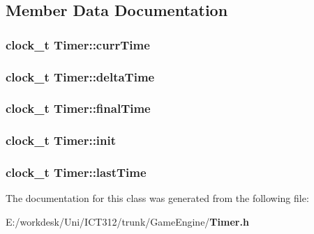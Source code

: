 \subsection{Member Data Documentation}
\subsubsection[{curr\+Time}]{\setlength{\rightskip}{0pt plus 5cm}clock\+\_\+t Timer\+::curr\+Time\hspace{0.3cm}{\ttfamily [private]}}\label{class_timer_af49068258630469cc88806ee557b626e}
\subsubsection[{delta\+Time}]{\setlength{\rightskip}{0pt plus 5cm}clock\+\_\+t Timer\+::delta\+Time\hspace{0.3cm}{\ttfamily [private]}}\label{class_timer_a512bec9968ee9b451a7c11b3279b366a}
\subsubsection[{final\+Time}]{\setlength{\rightskip}{0pt plus 5cm}clock\+\_\+t Timer\+::final\+Time\hspace{0.3cm}{\ttfamily [private]}}\label{class_timer_a04f2fc3b23b6f7b629395e38341fdca4}
\subsubsection[{init}]{\setlength{\rightskip}{0pt plus 5cm}clock\+\_\+t Timer\+::init\hspace{0.3cm}{\ttfamily [private]}}\label{class_timer_ac21537502a274627c7a1eb11bf9e5ad9}
\subsubsection[{last\+Time}]{\setlength{\rightskip}{0pt plus 5cm}clock\+\_\+t Timer\+::last\+Time\hspace{0.3cm}{\ttfamily [private]}}\label{class_timer_acf6310656f7f405df0af5853a05b63dd}


The documentation for this class was generated from the following file\+:\begin{DoxyCompactItemize}
\item 
E\+:/workdesk/\+Uni/\+I\+C\+T312/trunk/\+Game\+Engine/{\bf Timer.\+h}\end{DoxyCompactItemize}
